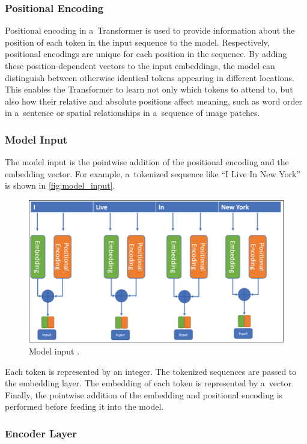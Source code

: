 \subsubsection*{Positional Encoding}

Positional encoding in a~Transformer is used to provide information about the position of each token in the input sequence to the model. Respectively, positional encodings are unique for each position in the sequence. By adding these position-dependent vectors to the input embeddings, the model can distinguish between otherwise identical tokens appearing in different locations. This enables the Transformer to learn not only which tokens to attend to, but also how their relative and absolute positions affect meaning, such as word order in a~sentence or spatial relationships in a~sequence of image patches.

\newpage
\subsubsection*{Model Input}

The model input is the pointwise addition of the positional encoding and the embedding vector. For example, a~tokenized sequence like \enquote{I Live In New York} is shown in \autoref{fig:model_input}.

\begin{figure}[htbp]
    \centering
    \includegraphics[width=0.7\linewidth]{obrazky-figures/02-theoretical-basis/model-input.png}
    \caption{Model input \cite{timsina2024building}.}
    \label{fig:model_input}
\end{figure}

Each token is represented by an integer. The tokenized sequences are passed to the embedding layer. The embedding of each token is represented by a~vector. Finally, the pointwise addition of the embedding and positional encoding is performed before feeding it into the model\cite{timsina2024building}.

\subsubsection*{Encoder Layer}

